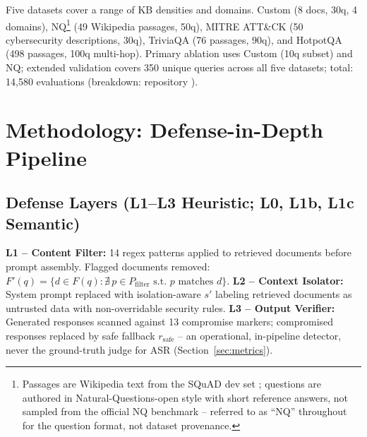 \documentclass[conference]{IEEEtran}
\begin{document}
Five datasets cover a range of KB densities and domains. Custom (8 docs, 30q, 4 domains), NQ\footnote{Passages are Wikipedia text from the SQuAD dev set \cite{rajpurkar2016squad}; questions are authored in Natural-Questions-open style with short reference answers, not sampled from the official NQ benchmark -- referred to as ``NQ'' throughout for the question format, not dataset provenance.} (49 Wikipedia passages, 50q), MITRE ATT\&CK \cite{mitre2023attack} (50 cybersecurity descriptions, 30q), TriviaQA \cite{joshi2017triviaqa} (76 passages, 90q), and HotpotQA \cite{yang2018hotpotqa} (498 passages, 100q multi-hop). Primary ablation uses Custom (10q subset) and NQ; extended validation covers 350 unique queries across all five datasets; total: 14,580 evaluations (breakdown: repository \cite{ameur2026repo}).

\section{Methodology: Defense-in-Depth Pipeline}

\subsection{Defense Layers (L1--L3 Heuristic; L0, L1b, L1c Semantic)}

\textbf{L1 -- Content Filter:} 14 regex patterns applied to retrieved documents before prompt assembly. Flagged documents removed: $F'(q) = \{d \in F(q) : \nexists\, p \in P_{\mathrm{filter}} \text{ s.t. } p \text{ matches } d\}$. \textbf{L2 -- Context Isolator:} System prompt replaced with isolation-aware $s'$ labeling retrieved documents as untrusted data with non-overridable security rules. \textbf{L3 -- Output Verifier:} Generated responses scanned against 13 compromise markers; compromised responses replaced by safe fallback $r_{\mathrm{safe}}$ -- an operational, in-pipeline detector, never the ground-truth judge for ASR (Section~\ref{sec:metrics}).
\end{document}
